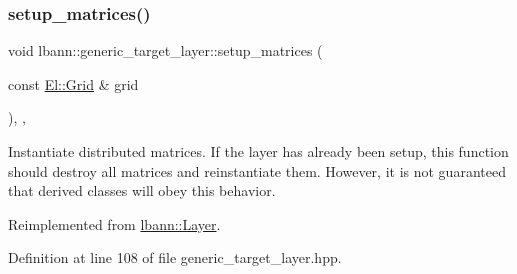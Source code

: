 \mbox{\label{classlbann_1_1generic__target__layer_af8bcdbd313c9793187fe6e53396e3356}} 
\subsubsection{\texorpdfstring{setup\+\_\+matrices()}{setup\_matrices()}}
{\footnotesize\ttfamily void lbann\+::generic\+\_\+target\+\_\+layer\+::setup\+\_\+matrices (\begin{DoxyParamCaption}\item[{const \hyperlink{base_8hpp_a9951bb1719d534e0401b1f06cad19eab}{El\+::\+Grid} \&}]{grid }\end{DoxyParamCaption})\hspace{0.3cm}{\ttfamily [inline]}, {\ttfamily [override]}, {\ttfamily [virtual]}}

Instantiate distributed matrices. If the layer has already been setup, this function should destroy all matrices and reinstantiate them. However, it is not guaranteed that derived classes will obey this behavior. 

Reimplemented from \hyperlink{classlbann_1_1Layer_a57bbe21131dc00ab5cf9ea5e3656808e}{lbann\+::\+Layer}.



Definition at line 108 of file generic\+\_\+target\+\_\+layer.\+hpp.


